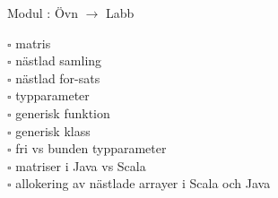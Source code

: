 
Modul : Övn  $\rightarrow$ Labb 
\begin{multicols}{3}\SlideFontTiny
$\square$ matris \\
$\square$ nästlad samling \\
$\square$ nästlad for-sats \\
$\square$ typparameter \\
$\square$ generisk funktion \\
$\square$ generisk klass \\
$\square$ fri vs bunden typparameter \\
$\square$ matriser i Java vs Scala \\
$\square$ allokering av nästlade arrayer i Scala och Java \\     
\end{multicols}
